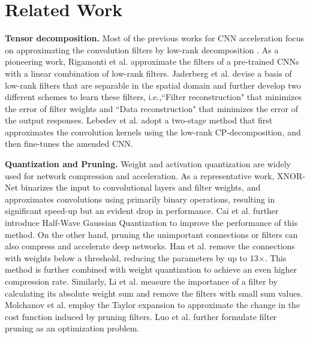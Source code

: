 \documentclass[letterpaper]{article} %
\begin{document}
\section{Related Work}
\noindent\textbf{Tensor decomposition. }Most of the previous works for CNN acceleration focus on approximating the convolution filters by low-rank decomposition \cite{rigamonti2013learning,jaderberg2014speeding,lebedev2014speeding,tai2015convolutional}. As a pioneering work, Rigamonti et al. \cite{rigamonti2013learning} approximate the filters of a pre-trained CNNs with a linear combination of low-rank filters. Jaderberg et al. \cite{jaderberg2014speeding} devise a basis of low-rank filters that are separable in the spatial domain and further develop two different schemes to learn these filters, i.e.,``Filter reconstruction" that minimizes the error of filter weights and ``Data reconstruction" that minimizes the error of the output responses. Lebedev et al. \cite{lebedev2014speeding} adopt a two-stage method that first approximates the convolution kernels using the low-rank CP-decomposition, and then fine-tunes the amended CNN.

\noindent\textbf{Quantization and Pruning. }Weight and activation quantization are widely used for network compression and acceleration. As a representative work, XNOR-Net \cite{rastegari2016xnor} binarizes the input to convolutional layers and filter weights, and approximates convolutions using primarily binary operations, resulting in significant speed-up but an evident drop in performance. Cai et al. \cite{cai2017deep} further introduce Half-Wave Gaussian Quantization to improve the performance of this method. On the other hand, pruning the unimportant connections or filters can also compress and accelerate deep networks. Han et al. \cite{han2015deep} remove the connections with weights below a threshold, reducing the parameters by up to 13$\times$. This method is further combined with weight quantization to achieve an even higher compression rate. Similarly, Li et al. \cite{li2016pruning} measure the importance of a filter by calculating its absolute weight sum and remove the filters with small sum values. Molchanov et al. \cite{molchanov2016pruning} employ the Taylor expansion to approximate the change in the cost function induced by pruning filters. Luo et al. \cite{luo2017thinet} further formulate filter pruning as an optimization problem.
\end{document}
